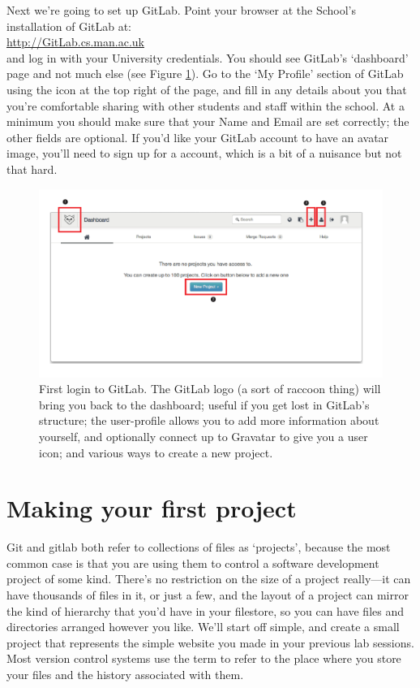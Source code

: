 Next we're going to set up GitLab. Point your browser at the School's installation of GitLab at:
\\
\url{http://GitLab.cs.man.ac.uk}
\\
and log in with your University credentials. You should see GitLab's `dashboard' page and not much else (see Figure \ref{figure:GitLab-first-login}). Go to the `My Profile' section of GitLab using the icon at the top right of the page, and fill in any details about you that you're comfortable sharing with other students and staff within the school. At a minimum you should make sure that your Name and Email are set correctly; the other fields are optional. If you'd like your GitLab account to have an avatar image, you'll need to sign up for a  account, which is a bit of a nuisance but not that hard.

\begin{figure}
\centerline{\includegraphics[width=15cm]{images/GitLab-first-login}}
\caption{First login to GitLab. \protect{} The GitLab logo (a sort of raccoon thing) will bring you back to the dashboard; useful if you get lost in GitLab's structure; \protect{} the user-profile allows you to add more information about yourself, and optionally connect up to Gravatar to give you a user icon; and \protect{} various ways to create a new project.}\label{figure:GitLab-first-login}
\end{figure}

\section{Making your first project}

Git and gitlab both refer to collections of files as `projects', because the most common case is that you are using them to control a software development project of some kind. There's no restriction on the size of a project really---it can have thousands of files in it, or just a few, and the layout of a project can mirror the kind of hierarchy that you'd have in your filestore, so you can have files and directories arranged however you like. We'll start off simple, and create a small project that represents the simple website you made in your previous lab sessions. Most version control systems use the term  to refer to the place where you store your files and the history associated with them. 

